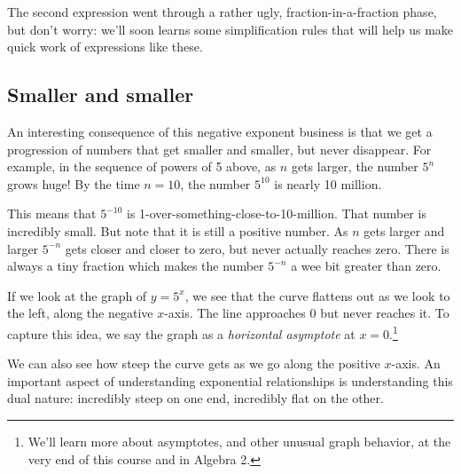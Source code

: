 The second expression went through a rather ugly, fraction-in-a-fraction phase, but don't worry: we'll soon learns some simplification rules that will help us make quick work of expressions like these.

\subsection{Smaller and smaller}

An interesting consequence of this negative exponent business is that we get a progression of numbers that get smaller and smaller, but never disappear. For example, in the sequence of powers of 5 above, as $n$ gets larger, the number $5^n$ grows huge! By the time $n=10$, the number $5^{10}$ is nearly 10 million.

This means that $5^{-10}$ is 1-over-something-close-to-10-million. That number is incredibly small. But note that it is still a positive number. As $n$ gets larger and larger $5^{-n}$ gets closer and closer to zero, but never actually reaches zero. There is always a tiny fraction which makes the number $5^{-n}$ a wee bit greater than zero.

If we look at the graph of $y=5^x$, we see that the curve flattens out as we look to the left, along the negative $x$-axis. The line approaches 0 but never reaches it. To capture this idea, we say the graph as a \textit{horizontal asymptote} at $x=0$.\footnote{We'll learn more about asymptotes, and other unusual graph behavior, at the very end of this course and in Algebra 2.}

\begin{center}
\end{center}

We can also see how steep the curve gets as we go along the positive $x$-axis. An important aspect of understanding exponential relationships is understanding this dual nature: incredibly steep on one end, incredibly flat on the other.

